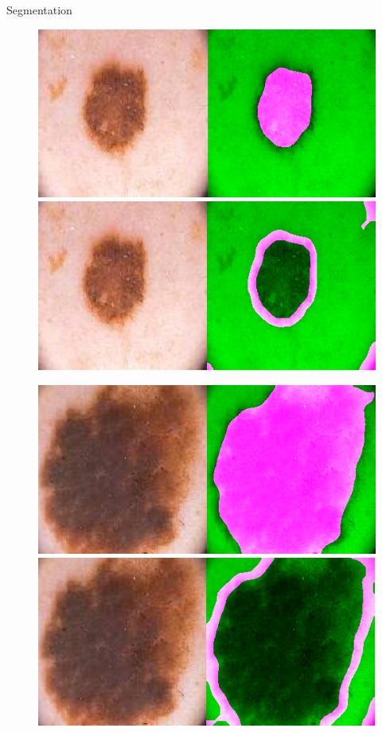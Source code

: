 \documentclass[aspectratio=169,xcolor=dvipsnames]{beamer}
\begin{document}
\begin{frame}{Segmentation}
\begin{figure}
\begin{minipage}{0.25\linewidth}
\end{minipage}\hspace{0.05\linewidth}
\begin{minipage}{0.25\linewidth}
	\includegraphics[width=\linewidth]{41.png}\vspace{2 mm}
	\includegraphics[width=\linewidth]{42.png}
\end{minipage}\hspace{0.05\linewidth}
\begin{minipage}{0.25\linewidth}
	\includegraphics[width=\linewidth]{281.png}\vspace{2 mm}
	\includegraphics[width=\linewidth]{282.png}

\end{minipage}
\end{figure}
\end{frame}
\end{document}
